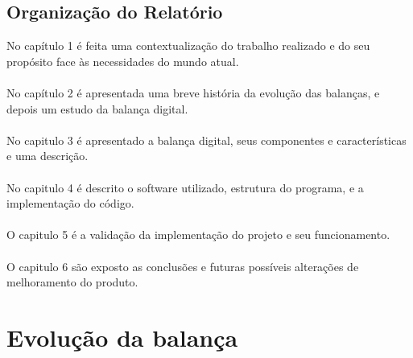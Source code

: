 \section{Organização do Relatório}
No capítulo 1 é feita uma contextualização do trabalho realizado e do seu propósito face às necessidades do mundo atual.
\\
\\
No capítulo 2 é apresentada uma breve história da evolução das balanças, e depois um estudo da balança digital.
\\
\\
No capitulo 3 é apresentado a balança digital, seus componentes e características e uma descrição.
\\
\\
No capitulo 4 é descrito o software utilizado, estrutura do programa, e a implementação do código.
\\
\\
O capitulo 5 é a validação da implementação do projeto e seu funcionamento.
\\
\\
O capitulo 6 são exposto as conclusões e futuras possíveis alterações de melhoramento do produto.
\chapter{Evolução da balança}
